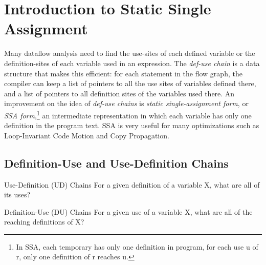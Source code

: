 \newpage



\section{Introduction to Static Single Assignment}

Many dataflow analysis need to find the use-sites of each defined variable or the definition-sites of each variable used in an expression.
 The \textit{def-use chain} is a data structure that makes this efficient: for each statement in the flow graph,
  the compiler can keep a list of pointers to all the use sites of variables defined there, and a list of pointers 
  to all definition sites of the variables used there. An improvement on the idea of \textit{def-use chains}
   is \textit{static single-assignment form}, or \textit{SSA form},\footnote{In SSA, each temporary has only one definition in program, for each use u
   of r, only one definition of r reaches u.} an intermediate representation in which each variable has only one definition in the program text. SSA is very useful for many optimizations such as Loop-Invariant Code Motion and Copy Propagation.



\subsection{Definition-Use and Use-Definition Chains}


\begin{definition}{Use-Definition (UD) Chains}
	For a given definition of a variable X, what are all of its uses?

\end{definition}



\begin{definition}{Definition-Use (DU) Chains}
	For a given use of a variable X, what are all of the reaching definitions of X?

\end{definition}



